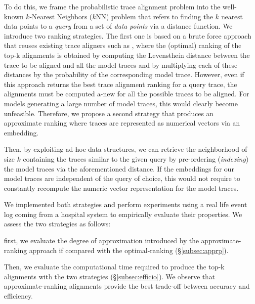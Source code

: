 To do this, we frame the probabilistic trace alignment problem into the well-known $k$-Nearest Neighbors ($k$NN) problem \cite{Altman} that refers to finding the $k$ nearest data points to a \textit{query}  from a set  of \textit{data points} via a distance function.
We introduce two ranking strategies. The first one is based on a brute force approach that reuses existing trace aligners such as \cite{DBLP:conf/edoc/AdriansyahDA11,LeoniM17}, where the (optimal) ranking of the top-k alignments is obtained by computing the Levensthein distance between the trace to be aligned and all the model traces and by multiplying each of these distances by the probability of the corresponding model trace. However, even if this approach returns the best trace alignment ranking for a query trace, the alignments must be computed a-new for all the possible traces to be aligned. For models generating a large number of model traces, this would clearly become unfeasible. Therefore, we propose a second strategy that produces an approximate ranking where traces are represented as numerical vectors via an embedding. {Then, by exploiting ad-hoc data structures,
	we can retrieve the neighborhood of size $k$ containing the traces similar to the given query  by pre-ordering (\textit{indexing}) the model traces  via the aforementioned distance.
	If the embeddings for our model traces are independent of the query of choice, this would not require to constantly recompute the numeric vector representation for the model traces.
	
	We implemented both strategies and perform experiments using a real life event log coming from a hospital system to empirically evaluate their properties. We assess the two strategies as follows:
\begin{mylist}
	\item first, we evaluate the degree of approximation introduced by the approximate-ranking approach if compared with the optimal-ranking (\S\ref{subsec:apprp}).
	\item Then, we evaluate the computational time required to produce the top-k alignments with the two strategies (\S\ref{subsec:efficio}). We observe that approximate-ranking alignments provide the best trade-off between accuracy and efficiency.
\end{mylist}

}

